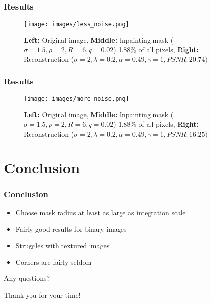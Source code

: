 \documentclass{beamer}
\begin{document}
    \begin{frame}
        \frametitle{Results}
        \begin{figure}[htpb]
            \centering
            \texttt{[image: images/less\_noise.png]}
            \caption{ \textbf{Left:} Original image, \textbf{Middle:} Inpainting mask ($\sigma=1.5,
            \rho=2, R=6, q=0.02$) 1.88\% of all pixels, \textbf{Right:} Reconstruction
            ($\sigma=2,\lambda=0.2,\alpha=0.49,\gamma=1, PSNR: 20.74)$}
        \end{figure}
    \end{frame}

    \begin{frame}
        \frametitle{Results}
        \begin{figure}[htpb]
            \centering
            \texttt{[image: images/more\_noise.png]}
            \caption{ \textbf{Left:} Original image, \textbf{Middle:} Inpainting mask ($\sigma=1.5,
            \rho=2, R=6, q=0.02$) 1.88\% of all pixels, \textbf{Right:} Reconstruction
            ($\sigma=2,\lambda=0.2,\alpha=0.49,\gamma=1, PSNR: 16.25)$}
        \end{figure}
    \end{frame}

    \section{Conclusion}
    \begin{frame}[t]
        \frametitle{Conclusion}
        \begin{itemize}[<+-|alert@+>]
            \item Choose mask radius at least as large as integration scale
            \item Fairly good results for binary images
            \item Struggles with textured images
            \item Corners are fairly seldom
        \end{itemize}

    \end{frame}

    \begin{frame}
        \centering\huge{Any questions?}
    \end{frame}

    \begin{frame}
        \centering\huge{Thank you for your time!}
    \end{frame}
\end{document}
